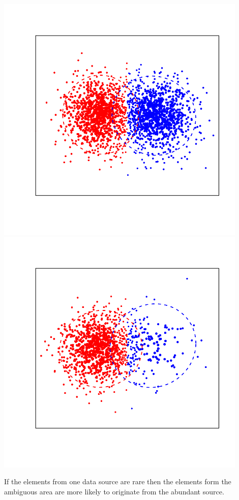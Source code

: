 \documentclass[landscape,footrule]{foils}
\begin{document}
\begin{center}
\includegraphics[width=12cm]{weighting-scheme-ii-1}\hspace*{-2cm}
\includegraphics[width=12cm]{weighting-scheme-ii-2}
\end{center}
\vspace*{-2cm}

If the elements from one data source are rare then the elements form the ambiguous area are more likely to originate from the abundant source.
\vspace*{-1cm}  
\end{document}
